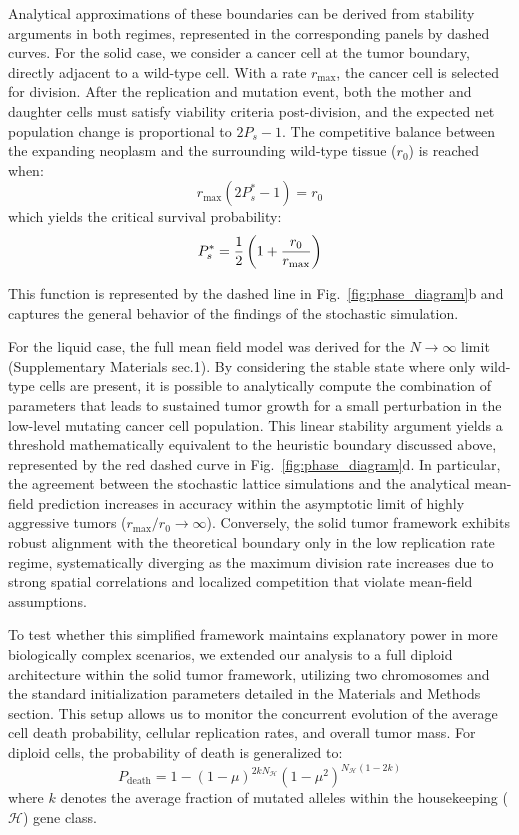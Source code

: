 \documentclass[10pt, aps, rmp,  twocolumn, superscriptaddress, floatfix, showkeys]{revtex4-2}
\begin{document}
Analytical approximations of these boundaries can be derived from stability arguments in both regimes, represented in the corresponding panels by dashed curves.
For the solid case, we consider a cancer cell at the tumor boundary, directly adjacent to a wild-type cell. With a rate $r_{\text{max}}$, the cancer cell is selected for division. After the replication and mutation event, both the mother and daughter cells must satisfy viability criteria post-division, and the expected net population change is proportional to $2P_s - 1$. The competitive balance between the expanding neoplasm and the surrounding wild-type tissue ($r_0$) is reached when:
$$
r_\text{max} (2P_s^* - 1) = r_0
$$
which yields the critical survival probability:
\begin{equation}
    P_s^* = {1 \over 2} \left ( 1 + {r_0 \over r_\text{max}} \right )
    \label{eq:p_abs_solid}
\end{equation}

This function is represented by the dashed line in Fig.~\ref{fig:phase_diagram}b and captures the general behavior of the findings of the stochastic simulation.

For the liquid case, the full mean field model was derived for the $N\rightarrow\infty$ limit (Supplementary Materials sec.1). By considering the stable state where only wild-type cells are present, it is possible to analytically compute the combination of parameters that leads to sustained tumor growth for a small perturbation in the low-level mutating cancer cell population. 
This linear stability argument yields a threshold mathematically equivalent to the heuristic boundary discussed above, represented by the red dashed curve in Fig.~\ref{fig:phase_diagram}d. In particular, the agreement between the stochastic lattice simulations and the analytical mean-field prediction increases in accuracy within the asymptotic limit of highly aggressive tumors ($r_{\text{max}}/r_0\rightarrow\infty$). Conversely, the solid tumor framework exhibits robust alignment with the theoretical boundary only in the low replication rate regime, systematically diverging as the maximum division rate increases due to strong 
spatial correlations and localized competition that violate mean-field assumptions.

To test whether this simplified framework maintains explanatory power in more biologically complex scenarios, we extended our analysis to a full diploid architecture within the solid tumor framework, utilizing two chromosomes and the standard initialization parameters detailed in the Materials and Methods section. 
This setup allows us to monitor the concurrent evolution of the average cell death probability, cellular replication rates, and overall tumor mass. For diploid cells, the probability of death is generalized to:
\begin{equation}
P_{\text{death}} = 1 - (1 - \mu)^{2k N_{\mathcal{H}}} (1 - \mu^2)^{N_{\mathcal{H}}(1 - 2k)}
\end{equation}
where $k$ denotes the average fraction of mutated alleles within the housekeeping ($\mathcal{H}$) gene class.
\end{document}
